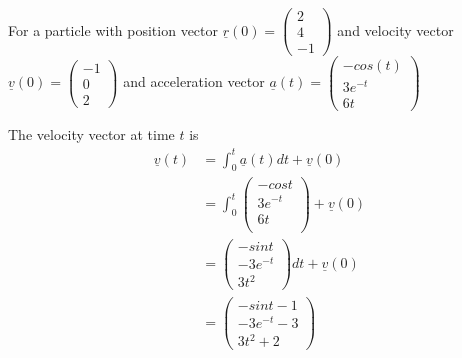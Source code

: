 \begin{framed}
   For a particle with position vector $ \underline{r}(0) = \begin{pmatrix}  2 \\ 4 \\ -1  \end{pmatrix} $ and velocity vector $ \underline{v}(0) = \begin{pmatrix}  -1 \\0 \\2  \end{pmatrix} $ and acceleration vector $ \underline{a}(t) = \begin{pmatrix}  -cos(t) \\ 3e^{-t} \\ 6t  \end{pmatrix} $ 

   The velocity vector at time $t$ is
      \begin{align*}
         \underline{v}(t) &= \int_{0}^{t} \underline{a}(t)dt + \underline{v}(0)\\
                          &= \int_{0}^{t} 
                          \begin{pmatrix}  
                             -cost \\
                             3e^{-t}\\
                             6t \\
                           \end{pmatrix} + \underline{v}(0)\\
                          &= \begin{pmatrix} 
                             -sint \\
                             -3e^{-t}\\
                             3t^2
                          \end{pmatrix}dt + \underline{v}(0)\\
                          &= \begin{pmatrix} 
                            -sint - 1\\
                            -3e^{-t} - 3 \\
                            3t^2 +2
                          \end{pmatrix}
      \end{align*}


\end{framed}
